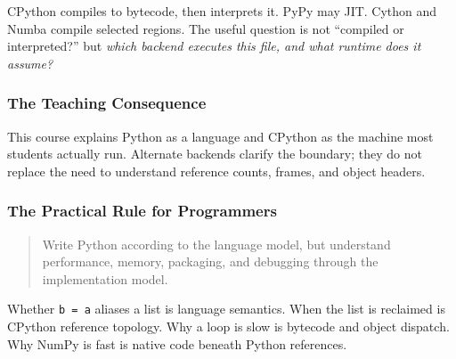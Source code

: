 CPython compiles to bytecode, then interprets it. PyPy may JIT. Cython and Numba compile selected regions. The useful question is not ``compiled or interpreted?'' but \emph{which backend executes this file, and what runtime does it assume?}

\subsubsection{The Teaching Consequence}

This course explains Python as a language and CPython as the machine most students actually run. Alternate backends clarify the boundary; they do not replace the need to understand reference counts, frames, and object headers.

\subsubsection{The Practical Rule for Programmers}

\begin{quote}
Write Python according to the language model, but understand performance, memory, packaging, and debugging through the implementation model.
\end{quote}

Whether \texttt{b = a} aliases a list is language semantics. When the list is reclaimed is CPython reference topology. Why a loop is slow is bytecode and object dispatch. Why NumPy is fast is native code beneath Python references.
